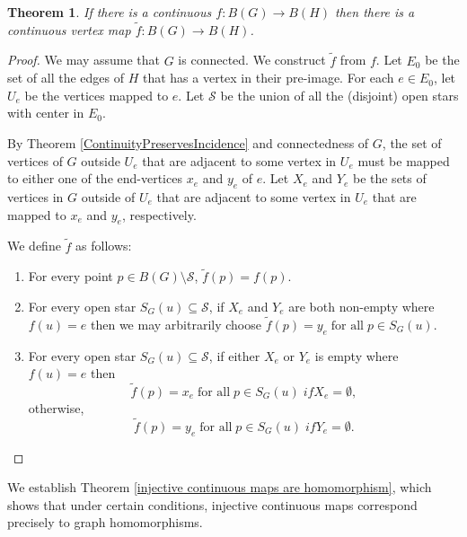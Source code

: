 \documentclass{amsart}
\newtheorem{theorem}{Theorem}[section]
\theoremstyle{definition}
\theoremstyle{remark}
\numberwithin{equation}{section}
\begin{document}
	\begin{theorem}
		\label{ContinuousmapsmeansContinuousVertexmap}
		If there is a continuous \(f:B(G) \rightarrow B(H)\) then there is a continuous vertex map \(\tilde{f}:B(G) \rightarrow B(H)\).
	\end{theorem}
	\begin{proof}
		We may assume that \(G\) is connected. We construct \(\tilde{f}\) from \(f\). Let \(E_0\) be the set of all the edges of \(H\) that has a vertex in their pre-image. For each \(e \in E_0\), let \(U_e\) be the vertices mapped to \(e\). Let \(\mathcal{S}\) be the union of all the (disjoint) open stars with center in \(E_0\).
		
		By Theorem \ref{ContinuityPreservesIncidence} and connectedness of \(G\), the set of vertices of \(G\) outside \(U_e\) that are adjacent to some vertex in \(U_e\) must be mapped to either one of the end-vertices \(x_e\) and \(y_e\) of \(e\). Let \(X_e\) and \(Y_e\) be the sets of vertices in \(G\) outside of \(U_e\) that are adjacent to some vertex in \(U_e\) that are mapped to \(x_e\) and \(y_e\), respectively.
		
		
		We define \(\tilde{f}\) as follows:
		
		\begin{enumerate}
			\item For every point \(p \in B(G) \setminus \mathcal{S}\), \(\tilde{f}(p) = f(p).\)
			\item For every open star \(S_G(u) \subseteq \mathcal{S}\), if \(X_e\) and \(Y_e\) are both non-empty where \(f(u) = e\) then we may arbitrarily choose \(\tilde{f}(p) = y_e \; \text{for all} \; p \in S_G(u).\)
			\item For every open star \(S_G(u) \subseteq \mathcal{S}\), if either \(X_e\) or \(Y_e\) is empty where \(f(u) = e\) then
			\[\tilde{f}(p) = x_e \; \text{for all} \; p \in S_G(u) \; if X_e = \emptyset,\]
			otherwise,
			\[\tilde{f}(p) = y_e \; \text{for all} \; p \in S_G(u) \; if Y_e = \emptyset.\]
		\end{enumerate}
	\end{proof}
	
	We establish Theorem \ref{injective continuous maps are homomorphism}, which shows that under certain conditions, injective continuous maps correspond precisely to graph homomorphisms.
	
\end{document}
